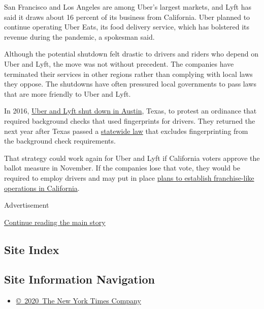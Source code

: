 San Francisco and Los Angeles are among Uber's largest markets, and Lyft
has said it draws about 16 percent of its business from California. Uber
planned to continue operating Uber Eats, its food delivery service,
which has bolstered its revenue during the pandemic, a spokesman said.

Although the potential shutdown felt drastic to drivers and riders who
depend on Uber and Lyft, the move was not without precedent. The
companies have terminated their services in other regions rather than
complying with local laws they oppose. The shutdowns have often
pressured local governments to pass laws that are more friendly to Uber
and Lyft.

In 2016,
\href{https://www.nytimes3xbfgragh.onion/2016/05/10/technology/uber-and-lyft-stop-rides-in-austin-to-protest-fingerprint-background-checks.html}{Uber
and Lyft shut down in Austin}, Texas, to protest an ordinance that
required background checks that used fingerprints for drivers. They
returned the next year after Texas passed a
\href{https://gov.texas.gov/news/post/governor-abbott-signs-bill-ending-local-regulations-of-transportation-netwo}{statewide
law} that excludes fingerprinting from the background check
requirements.

That strategy could work again for Uber and Lyft if California voters
approve the ballot measure in November. If the companies lose that vote,
they would be required to employ drivers and may put in place
\href{https://www.nytimes3xbfgragh.onion/2020/08/18/technology/uber-lyft-franchise-california.html}{plans
to establish franchise-like operations in California}.

Advertisement

\protect\hyperlink{after-bottom}{Continue reading the main story}

\hypertarget{site-index}{%
\subsection{Site Index}\label{site-index}}

\hypertarget{site-information-navigation}{%
\subsection{Site Information
Navigation}\label{site-information-navigation}}

\begin{itemize}
\tightlist
\item
  \href{https://help.nytimes3xbfgragh.onion/hc/en-us/articles/115014792127-Copyright-notice}{©~2020~The
  New York Times Company}
\end{itemize}

